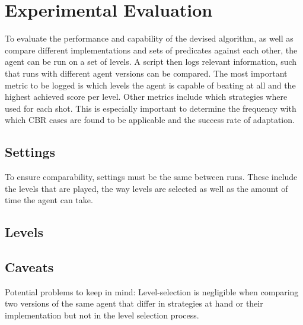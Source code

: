\section{Experimental Evaluation}\label{sec:experimental}
To evaluate the performance and capability of the devised algorithm, as well as compare different implementations and sets of predicates against each other, the agent can be run on a set of levels.
A script then logs relevant information, such that runs with different agent versions can be compared.
The most important metric to be logged is which levels the agent is capable of beating at all and the highest achieved score per level.
Other metrics include which strategies where used for each shot.
This is especially important to determine the frequency with which \acs{CBR} cases are found to be applicable and the success rate of adaptation.



\subsection{Settings}\label{subsec:settings}
To ensure comparability, settings must be the same between runs. These include the levels that are played, the way levels are selected as well as the amount of time the agent can take. %
\subsection{Levels}\label{subsec:levels}
\subsection{Caveats}\label{subsec:caveats}
Potential problems to keep in mind: Level-selection is negligible when comparing two versions of the same agent that differ in strategies at hand or their implementation but not in the level selection process.
